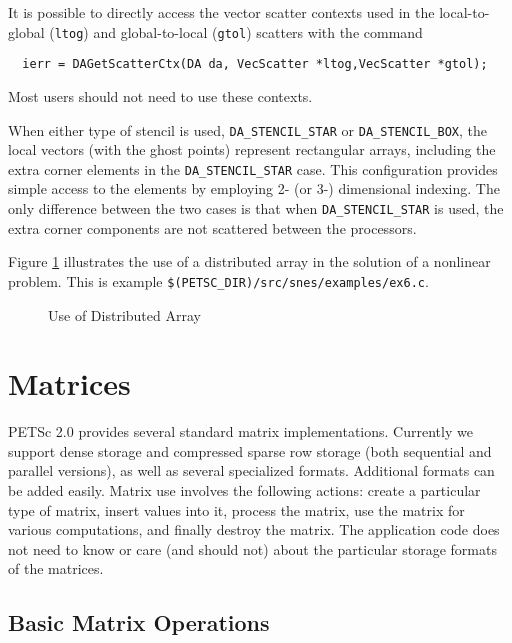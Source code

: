 It is possible to directly access the vector scatter contexts 
used in the local-to-global ({\tt ltog}) and global-to-local 
({\tt gtol}) scatters with the command 
\begin{verbatim}
  ierr = DAGetScatterCtx(DA da, VecScatter *ltog,VecScatter *gtol);
\end{verbatim}
Most users should not need to use these contexts.

When either type of stencil is used, {\tt DA\_STENCIL\_STAR} or 
{\tt DA\_STENCIL\_BOX}, the local vectors (with the ghost points) 
represent rectangular arrays, including the extra corner elements in 
the {\tt DA\_STENCIL\_STAR} case. This configuration provides simple 
access to the elements by employing 2- (or 3-) dimensional indexing. 
The only difference between the 
two cases is that when {\tt DA\_STENCIL\_STAR} is used, the extra 
corner components are not scattered between the processors.

Figure \ref{fig:daexample} illustrates the use 
of a distributed array in the solution of a nonlinear problem.
This is example {\tt \$(PETSC\_DIR)/src/snes/examples/ex6.c}.

\begin{figure}[H]
{\small
{}
}
\caption{Use of Distributed Array}
\label{fig:daexample}
\end{figure}

\chapter{Matrices}
\label{chapter:matrices}

PETSc 2.0 provides several standard matrix implementations.
Currently we support dense storage and compressed sparse row storage
(both sequential and parallel versions), as well as several 
specialized formats.  Additional formats can be added easily.
Matrix use involves the following actions: create a particular 
type of matrix, insert values into it, process the matrix, use the 
matrix for various computations, and finally destroy the matrix.
The application code does not need to know or care (and should not)
about the particular 
storage formats of the matrices.

\section{Basic Matrix Operations}
\label{sec:matoptions}

